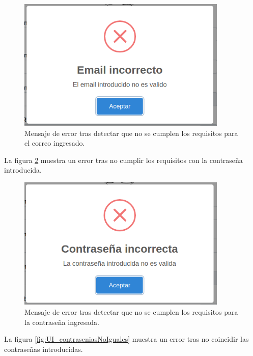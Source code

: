 \documentclass[12pt, a4paper, titlepage]{report}
\begin{document}
    			\begin{figure}[H]
    				\begin{center}	\includegraphics[width=10cm]{./imagenes/Disenio/Componente_1/UI_emailIncorrecto.PNG}
    					\caption[Mensaje de error]{Mensaje de error tras detectar que no se cumplen los requisitos para el correo ingresado.}
    				\label{fig:UI_emailIncorrecto}
    				\end{center}
    			\end{figure}
    			
    			La figura \ref{fig:UI_contraseniaIncorrecto} muestra un error tras no cumplir los requisitos con la contraseña introducida.
    			
    			\begin{figure}[H]
    				\begin{center}	\includegraphics[width=10cm]{./imagenes/Disenio/Componente_1/UI_contraseniaIncorrecto.PNG}
    					\caption[Mensaje de error]{Mensaje de error tras detectar que no se cumplen los requisitos para la contraseña ingresada.}
    				\label{fig:UI_contraseniaIncorrecto}
    				\end{center}
    			\end{figure}
    			
    			La figura \ref{fig:UI_contraseniasNoIguales} muestra un error tras no coincidir las contraseñas introducidas.
    			
\end{document}
